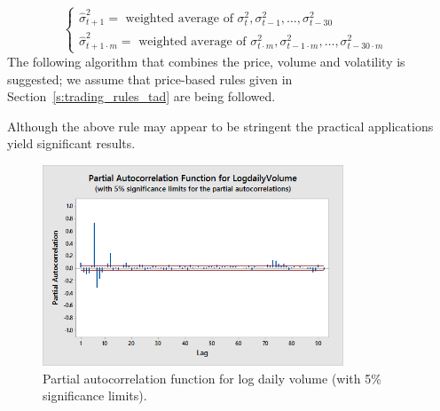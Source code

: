 	\[
	\begin{cases}
	\hat{\sigma}_{t+1}^2 = \text{ weighted average of } \sigma_t^2, \sigma_{t-1}^2, \ldots, \sigma_{t-30}^2 & \\
	\hat{\sigma}^2_{t+1 \cdot m}= \text{ weighted average of } \sigma_{t\cdot m}^2, \sigma_{t-1 \cdot m}^2, \ldots, \sigma_{t-30\cdot m}^2 & 
	\end{cases}
	\]
The following algorithm that combines the price, volume and volatility is suggested; we assume that price-based rules given in Section~\ref{s:trading_rules_tad} are being followed. \medbreak

\begin{center}
\end{center} \twomedskip

\noindent Although the above rule may appear to be stringent the practical applications yield significant results. 
	
        \begin{figure}[!ht]
        \centering
        \includegraphics[width=0.8\textwidth]{chapters/chapter_stat_ts/figures/logdaily.png}
        \caption{Partial autocorrelation function for log daily volume (with 5\% significance limits). \label{fig:logdailyvolume}}
        \end{figure}
        
